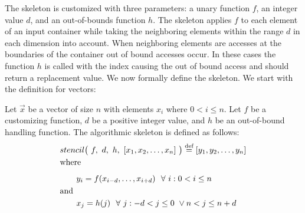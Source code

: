 The \stencil skeleton is customized with three parameters: a unary function $f$, an integer value $d$, and an out-of-bounds function $h$.
The skeleton applies $f$ to each element of an input container while taking the neighboring elements within the range $d$ in each dimension into account.
When neighboring elements are accesses at the boundaries of the container out of bound accesses occur.
In these cases the function $h$ is called with the index causing the out of bound access and should return a replacement value.
We now formally define the \stencil skeleton. We start with the definition for vectors:
\begin{definition}
  \label{definition:mapoverlap}
  Let $\vec{x}$ be a vector of size $n$ with elements $x_i$ where $0 < i \leq n$.
  Let $f$ be a customizing function, $d$ be a positive integer value, and $h$ be an out-of-bound handling function.
  The algorithmic skeleton \stencil is defined as follows:
  \begin{equation*}
    \begin{split}
    &stencil \big(\ f,\  d,\ h,\ [x_1, x_2, \dots, x_n]\ \big) \eqdef [y_1, y_2, \dots, y_n]\\
    &\text{where}\\[.5em]
    &\qquad y_i = f(x_{i-d}, \ldots, x_{i+d}) \ \ \forall\ i :  0 < i \leq n\\
    &\text{and\hfill}\\
    &\qquad x_j = h(j) \ \ \forall\ j : -d < j \leq 0\ \vee n < j \leq n+d
    \end{split}
  \end{equation*}
\end{definition}

